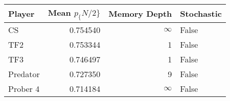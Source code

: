 \begin{tabular}{lrrl}
\toprule
   Player &  Mean $p_\{N/2\}$ &  Memory Depth & Stochastic \\
\midrule
       CS &        0.754540 &            \(\infty\) &      False \\
      TF2 &        0.753344 &             1 &      False \\
      TF3 &        0.746497 &             1 &      False \\
 Predator &        0.727350 &             9 &      False \\
 Prober 4 &        0.714184 &            \(\infty\) &      False \\
\bottomrule
\end{tabular}
